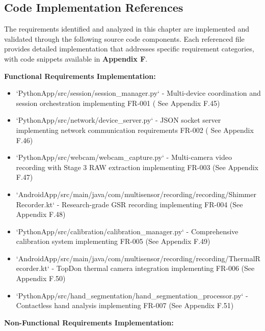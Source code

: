 \documentclass[12pt,a4paper]{article}
\begin{document}
\subsection{Code Implementation References}

The requirements identified and analyzed in this chapter are implemented and validated through the following source code
components. Each referenced file provides detailed implementation that addresses specific requirement categories, with
code snippets available in \textbf{Appendix F}.

\textbf{Functional Requirements Implementation:}

\begin{itemize}
\item `PythonApp/src/session/session_manager.py` - Multi-device coordination and session orchestration implementing FR-001 (
  See Appendix F.45)
\item `PythonApp/src/network/device_server.py` - JSON socket server implementing network communication requirements FR-002 (
  See Appendix F.46)
\item `PythonApp/src/webcam/webcam_capture.py` - Multi-camera video recording with Stage 3 RAW extraction implementing
  FR-003 (See Appendix F.47)
\item `AndroidApp/src/main/java/com/multisensor/recording/recording/ShimmerRecorder.kt` - Research-grade GSR recording
  implementing FR-004 (See Appendix F.48)
\item `PythonApp/src/calibration/calibration_manager.py` - Comprehensive calibration system implementing FR-005 (See
  Appendix F.49)
\item `AndroidApp/src/main/java/com/multisensor/recording/recording/ThermalRecorder.kt` - TopDon thermal camera integration
  implementing FR-006 (See Appendix F.50)
\item `PythonApp/src/hand_segmentation/hand_segmentation_processor.py` - Contactless hand analysis implementing FR-007 (See
  Appendix F.51)

\end{itemize}
\textbf{Non-Functional Requirements Implementation:}
\end{document}
